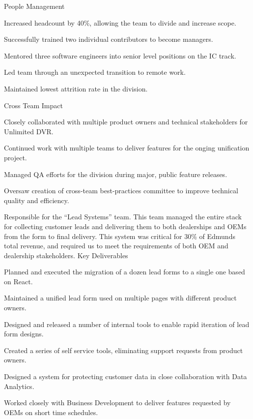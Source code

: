 \documentclass[]{deedy-resume-openfont}
\begin{document}
\sectionsep
People Management
\begin{tightemize}
\item Increased headcount by 40\%, allowing the team to divide and increase scope.
\item Successfully trained two individual contributors to become managers.
\item Mentored three software engineers into senior level positions on the IC track.
\item Led team through an unexpected transition to remote work.
\item Maintained lowest attrition rate in the division.
\end{tightemize}
\sectionsep

Cross Team Impact
\begin{tightemize}
\item Closely collaborated with multiple product owners and technical stakeholders for Unlimited DVR.
\item Continued work with multiple teams to deliver features for the onging unification project.
\item Managed QA efforts for the division during major, public feature releases.
\item Oversaw creation of cross-team best-practices committee to improve technical quality and efficiency.
\end{tightemize}
\sectionsep

\vspace{\topsep}
Responsible for the ``Lead Systems'' team. This team managed the entire stack for collecting customer leads and delivering them to both dealerships and OEMs from the form to final delivery. This system was critical for 30\% of Edmunds total revenue, and required us to meet the requirements of both OEM and dealership stakeholders.
\vspace{\topsep}
\newline
Key Deliverables
\begin{tightemize}
\item Planned and executed the migration of a dozen lead forms to a single one based on React.
\item Maintained a unified lead form used on multiple pages with different product owners.
\item Designed and released a number of internal tools to enable rapid iteration of lead form designs.
\item Created a series of self service tools, eliminating support requests from product owners.
\item Designed a system for protecting customer data in close collaboration with Data Analytics.
\item Worked closely with Business Development to deliver features requested by OEMs on short time schedules.
\end{tightemize}
\end{document}
